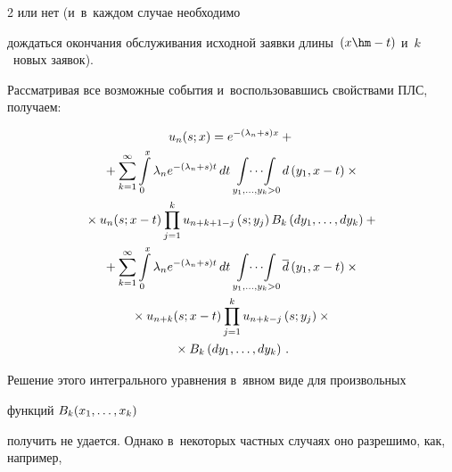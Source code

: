 \begin{multicols}{2}
или нет (и~в~каждом случае необходимо


дождаться окончания обслуживания исходной заявки длины~$(x\hm-t)$ и~$k$~новых заявок).


Рассматривая все возможные события и~воспользовавшись свойствами ПЛС, получаем:


\begin{multline}


u_{n}(s;x) = e^{- (\lambda_n+s) x}


+{}


\\


{}+


\sum\limits_{k=1}^\infty


\int\limits_0^x \lambda_n e^{- (\lambda_n+s) t} \, dt


\mathop{\int\!\cdots\!\int}\limits_{y_1,\ld,y_{k}>0}


d\left(y_1,x-t\right)\times{}\\


{}\times u_n(s;x-t)


\prod\limits_{j=1}^k u_{n+k+1-j}\left(s;y_j\right) B_k\left(dy_1,\dots,dy_k\right)


+{}


\\


{}+


\sum\limits_{k=1}^\infty \int\limits_0^x


\lambda_n e^{- (\lambda_n+s) t} \, dt


\mathop{\int\!\cdots\!\int}\limits_{y_1,\ld,y_{k}>0}


\d\left(y_1,x-t\right)\times{}\\


{}\times u_{n+k}(s;x-t) 


\prod\limits_{j=1}^k u_{n+k-j}\left(s;y_j\right)\times{}\\


{}\times


B_k\left(dy_1,\dots,dy_k\right)\,.


\label{uns}


\end{multline}





\noindent


Решение этого интегрального уравнения в~явном виде для произвольных 


функций $B_k(x_1,\ldots,x_k)$


получить не удается. Однако в~некоторых частных случаях оно разрешимо, как, например,



\end{multicols}
